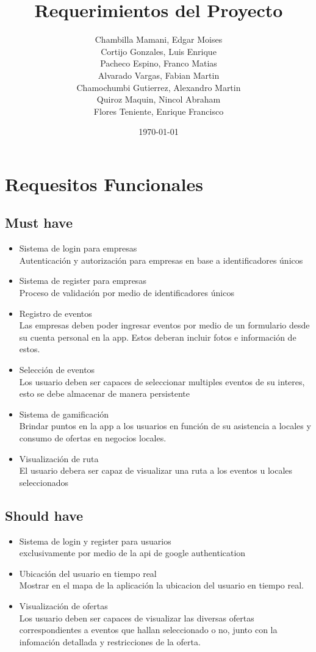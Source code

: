 \documentclass[a4paper,12pt,oneside]{article}
\author{
  \begin{tabular}{cc}
      \\
  Chambilla Mamani, Edgar Moises \\
  Cortijo Gonzales, Luis Enrique \\
  Pacheco Espino, Franco Matias \\
  Alvarado Vargas, Fabian Martin \\
  Chamochumbi Gutierrez, Alexandro Martin \\
  Quiroz Maquin, Nincol Abraham \\
  Flores Teniente, Enrique Francisco \\
  \end{tabular}
}
\title{Requerimientos del Proyecto}
\date{\today}
\begin{document}


\tableofcontents
\newpage


\section{Requesitos Funcionales}

\subsection{Must have}
  \begin{itemize}
    \item Sistema de login para empresas \\
      Autenticación y autorización para empresas en base a identificadores únicos
    \item Sistema de register para empresas \\
      Proceso de validación por medio de identificadores únicos
    \item Registro de eventos \\
      Las empresas deben poder ingresar eventos por medio de un formulario desde su cuenta personal en la app. Estos deberan incluir fotos e información de estos.
    \item Selección de eventos \\
      Los usuario deben ser capaces de seleccionar multiples eventos de su interes, esto se debe almacenar de manera persistente
    \item Sistema de gamificación \\
      Brindar puntos en la app a los usuarios en función de su asistencia a locales y consumo de ofertas en negocios locales.
    \item Visualización de ruta \\
      El usuario debera ser capaz de visualizar una ruta a los eventos u locales seleccionados

  \end{itemize}

\subsection{Should have}
  \begin{itemize}
    \item Sistema de login y register para usuarios \\
      exclusivamente por medio de la api de google authentication
    \item Ubicación del usuario en tiempo real \\
      Mostrar en el mapa de la aplicación la ubicacion del usuario en tiempo real.
    \item Visualización de ofertas \\
      Los usuario deben ser capaces de visualizar las diversas ofertas correspondientes a eventos que hallan seleccionado o no, junto con la infomación detallada y restricciones de la oferta.
  \end{itemize}
\end{document}
